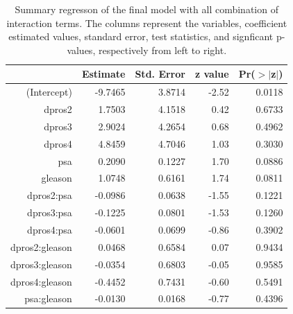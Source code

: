 \documentclass[11pt]{article}\usepackage[]{graphicx}\usepackage[]{color}
\begin{document}
\begin{center}
\begin{table}[ht]
\centering
\begin{tabular}{rrrrr}
  \hline
 & Estimate & Std. Error & z value & Pr($>$$|$z$|$) \\ 
  \hline
(Intercept) & -9.7465 & 3.8714 & -2.52 & 0.0118 \\ 
  dpros2 & 1.7503 & 4.1518 & 0.42 & 0.6733 \\ 
  dpros3 & 2.9024 & 4.2654 & 0.68 & 0.4962 \\ 
  dpros4 & 4.8459 & 4.7046 & 1.03 & 0.3030 \\ 
  psa & 0.2090 & 0.1227 & 1.70 & 0.0886 \\ 
  gleason & 1.0748 & 0.6161 & 1.74 & 0.0811 \\ 
  dpros2:psa & -0.0986 & 0.0638 & -1.55 & 0.1221 \\ 
  dpros3:psa & -0.1225 & 0.0801 & -1.53 & 0.1260 \\ 
  dpros4:psa & -0.0601 & 0.0699 & -0.86 & 0.3902 \\ 
  dpros2:gleason & 0.0468 & 0.6584 & 0.07 & 0.9434 \\ 
  dpros3:gleason & -0.0354 & 0.6803 & -0.05 & 0.9585 \\ 
  dpros4:gleason & -0.4452 & 0.7431 & -0.60 & 0.5491 \\ 
  psa:gleason & -0.0130 & 0.0168 & -0.77 & 0.4396 \\ 
   \hline
\end{tabular}
\caption{Summary regresson of the final model with all combination of interaction terms. The columns represent the variables, coefficient estimated values, standard error, test statistics, and signficant p-values, respectively from left to right.} 
\label{reg_summary_int}
\end{table}

\end{center}
\end{document}
